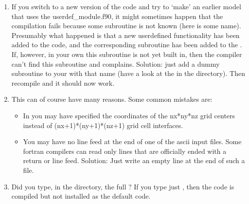 \documentclass[letterpaper,10pt,english]{sphinxmanual}
\begin{document}
\begin{enumerate}
\item {} 

If you switch to a new version of the code and try to ‘make’ an earlier model
that uses the userdef\_module.f90, it might sometimes happen that the
compilation fails because some subroutine  is not known (here
\sphinxcode{\sphinxupquote{***}} is some name). Presumably what happened is that a new user\sphinxhyphen{}defined
functionality has been added to the code, and the corresponding subroutine
 has been added to the . If, however,
in your own  this subroutine is not yet built in, then
the compiler can’t find this subroutine and complains. Solution: just add a
dummy subroutine to your  with that name (have a look
at the  in the  directory).  Then recompile and
it should now work.

\item {} 

This can of course have many reasons. Some common mistakes are:
\begin{itemize}
\item {} 
In  you may have specified the coordinates of the nx*ny*nz
grid centers instead of (nx+1)*(ny+1)*(nz+1) grid cell interfaces.

\item {} 
You may have no line feed at the end of one of the ascii input files.  Some
fortran compilers can read only lines that are officially ended with a
return or line feed. Solution: Just write an empty line at the end of such
a file.

\end{itemize}

\item {} 

Did you type, in the  directory, the full ? If you
type just , then the code is compiled but not installed as the
default code.


\end{enumerate}
\end{document}
